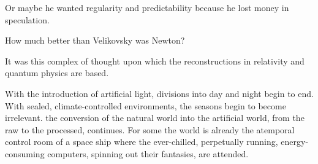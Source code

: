Or maybe he wanted regularity and predictability because he lost money in speculation.

How much better than Velikovsky was Newton?

It was this complex of thought upon
which the reconstructions in relativity and
quantum physics are based.

With the introduction of artificial light, divisions into day and night begin to end. With
sealed, climate-controlled
environments,
the seasons begin to become irrelevant. the
conversion of the natural world into the artificial world, from the raw
to the processed, continues. For some the world is
already the atemporal control room of a
space ship where the ever-chilled, perpetually running, energy-consuming computers,
spinning out their fantasies, are attended.

